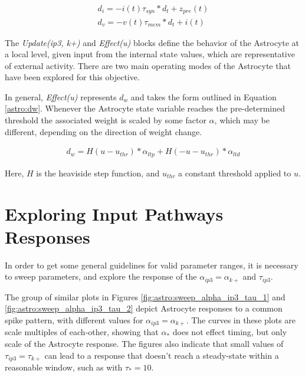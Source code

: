     \begin{align}
      d_{i} = -i(t) \tau_{syn} * d_t + z_{pre}(t) \label{eq:lif:i} \\
      d_{v} = -v(t) \tau_{mem} * d_t + i(t) \label{eq:lif:v}
    \end{align}

    The \emph{Update(ip3, k+)} and \emph{Effect(u)} blocks define the behavior
    of the Astrocyte at a local level, given input from the internal state
    values, which are representative of external activity. There are two main
    operating modes of the Astrocyte that have been explored for this objective.

    In general, \emph{Effect(u)} represents $d_w$ and takes the form outlined in
    Equation \ref{astro:dw}. Whenever the Astrocyte state variable reaches the
    pre-determined threshold the associated weight is scaled by some factor
    $\alpha$, which may be different, depending on the direction of weight
    change.

    \begin{align}
      d_w = H(u - u_{thr}) * \alpha_{ltp} + H(-u - u_{thr}) * \alpha_{ltd} \label{astro:dw}
    \end{align}

    Here, $H$ is the heaviside step function, and $u_{thr}$ a constant threshold
    applied to $u$.
    
    \section{Exploring Input Pathways Responses}

    In order to get some general guidelines for valid parameter ranges, it is
    necessary to sweep parameters, and explore the response of the
    $\alpha_{ip3}=\alpha_{k+}$ and $\tau_{ip3}$.
    


    The group of similar plots in Figures \ref{fig:astro:sweep_alpha_ip3_tau_1} and
    \ref{fig:astro:sweep_alpha_ip3_tau_2} depict Astrocyte responses to a common
    spike pattern, with different values for $\alpha_{ip3}=\alpha_{k+}$. The
    curves in these plots are scale multiples of each-other, showing that
    $\alpha_*$ does not effect timing, but only scale of the Astrocyte
    response. The figures also indicate that small values of
    $\tau_{ip3}=\tau_{k+}$ can lead to a response that doesn't reach a
    steady-state within a reasonable window, such as with $\tau_* = 10$.

